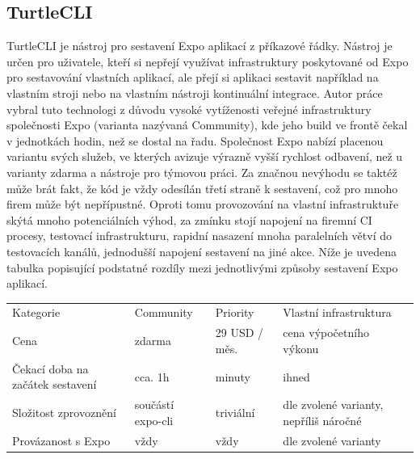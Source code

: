 
\subsection{TurtleCLI}

TurtleCLI je nástroj pro sestavení Expo aplikací z příkazové řádky. Nástroj je určen pro uživatele, kteří si nepřejí využívat infrastruktury poskytované od Expo pro sestavování vlastních aplikací, ale přejí si aplikaci sestavit například na vlastním stroji nebo na vlastním nástroji kontinuální integrace. Autor práce vybral tuto technologi z důvodu vysoké vytíženosti veřejné infrastruktury společnosti Expo (varianta nazývaná Community), kde jeho build ve frontě čekal v jednotkách hodin, než se dostal na řadu. Společnost Expo nabízí placenou variantu svých služeb, ve kterých avizuje výrazně vyšší rychlost odbavení, než u varianty zdarma a nástroje pro týmovou práci. Za značnou nevýhodu se taktéž může brát fakt, že kód je vždy odesílán třetí straně k sestavení, což pro mnoho firem může být nepřípustné. Oproti tomu provozování na vlastní infrastruktuře skýtá mnoho potenciálních výhod, za zmínku stojí napojení na firemní CI procesy, testovací infrastrukturu, rapidní nasazení mnoha paralelních větví do testovacích kanálů, jednodušší napojení sestavení na jiné akce. Níže je uvedena tabulka popisující podstatné rozdíly mezi jednotlivými způsoby sestavení Expo aplikací. 

\begin{table}[h]
	\begin{tabular}{llll}
		Kategorie                        & Community         & Priority      & Vlastní infrastruktura                 \\
		Cena                             & zdarma            & 29 USD / měs. & cena výpočetního výkonu                \\
		Čekací doba na začátek sestavení & cca. 1h           & minuty        & ihned                                  \\
		Složitost zprovoznění            & součástí expo-cli & triviální     & dle zvolené varianty, nepříliš náročné \\
		Provázanost s Expo               & vždy              & vždy          & dle zvolené varianty                  
	\end{tabular}
\end{table}
